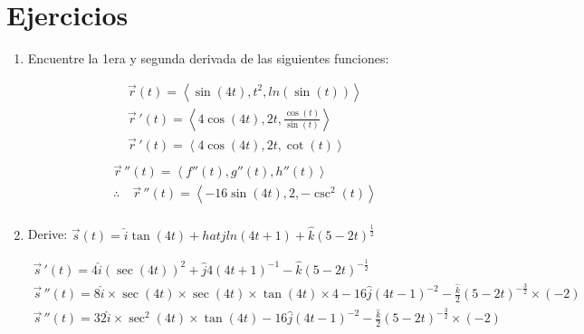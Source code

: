 \section{Ejercicios}
\begin{enumerate}
    \item Encuentre la 1era y segunda derivada de las siguientes funciones:
        \begin{center}
            \begin{align*}
                \vec{r}(t) = \left\langle \sin(4t),t^2,ln(\sin(t)) \right\rangle \\ 
                \vec{r}\,'(t) = \left\langle 4\cos(4t),2t,\frac{\cos(t)}{\sin(t)}  \right\rangle \\ 
                \vec{r}\,'(t) = \left\langle 4\cos(4t),2t,\cot(t) \right\rangle \\ 
            \end{align*}
            \begin{align*}
                \vec{r}\,''(t) = \left\langle f''(t),g''(t),h''(t) \right\rangle \\ 
                \therefore \quad \vec{r}\,''(t) = \left\langle -16\sin(4t),2,-\csc^2(t) \right\rangle \\ 
            \end{align*}
        \end{center}
    
    \item Derive: $\vec{s}(t) = \hat{i} \tan(4t) + hat{j}ln(4t+1) + \hat{k} (5-2t)^{\frac{1}{2} }$
        \begin{center}
            \begin{align*}
                \vec{s}\,'(t) = 4 \hat{i} (\sec(4t))^2 + \hat{j} 4(4t+1)^{-1} -\hat{k} (5-2t)^{-\frac{1}{2} } \\ 
                \vec{s}\,''(t) = 8 \hat{i} \times \sec(4t)\times  \sec(4t)\times  \tan (4t) \times 4  - 16 \hat{j} (4t-1)^{-2} - \frac{\hat{k}}{2} (5-2t)^{-\frac{3}{2} } \times (-2) \\  
                \vec{s}\,''(t) = 32 \hat{i} \times \sec^2(4t)\times  \tan (4t)  - 16 \hat{j} (4t-1)^{-2} - \frac{\hat{k}}{2} (5-2t)^{-\frac{3}{2} } \times (-2) \\ 
            \end{align*}
        \end{center}
\end{enumerate}


